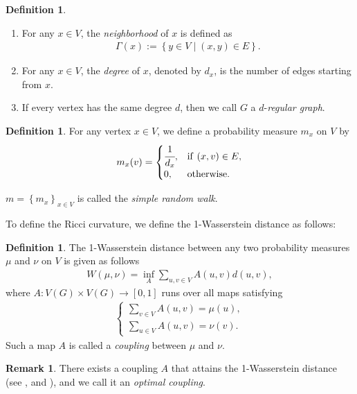 \documentclass[leqno,12pt]{amsart} %
\theoremstyle{plain} %
\theoremstyle{definition} %
\newtheorem{definition}[theorem]{\indent\sc Definition}
\newtheorem{remark}[theorem]{\indent\sc Remark}
\begin{document}
\begin{definition}
	\begin{enumerate}
 	\renewcommand{\labelenumi}{(\arabic{enumi})}
 	\item For any $x \in V$, the {\em neighborhood} of $x$ is defined as
   		\begin{eqnarray*}
   		\Gamma(x) := \left\{y \in V \mid (x, y) \in E \right\}.
   		\end{eqnarray*}
  	\item For any $x \in V$, the {\em degree} of $x$, denoted by $d_{x}$, is the number of edges starting from $x$.
	\item If every vertex has the same degree $d$, then we call $G$ a $d$-{\em regular graph}.
   	\end{enumerate}
\end{definition}

\begin{definition}
For any vertex $x \in V$, we define a probability measure $m_{x}$ on $V$ by
	\begin{eqnarray*}
    	m_{x}(v) = 
    		\begin{cases}
    		\cfrac{1}{d_{x}}, &\mathrm{if}\ (x, v) \in E, \\
    		0, & \mathrm{\mathrm{otherwise}}.
    		\end{cases}
   	\end{eqnarray*}
\end{definition} 
$m=\left\{ m_x \right\}_{x \in V}$ is called the {\em simple random walk}.

To define the Ricci curvature, we define the 1-Wasserstein distance as follows:
\begin{definition}
The 1-Wasserstein distance between any two probability measures $\mu$ and $\nu$ on $V$ is given as follows
	\begin{eqnarray*}
	W(\mu, \nu) = \inf_{A} \sum_{u, v \in V}A(u, v)d(u, v),
	\end{eqnarray*}
	where $A : V(G) \times V(G) \to [0, 1]$ runs over all maps satisfying 
	\begin{eqnarray}
	\label{coupling}
		\begin{cases}
		\sum_{v \in V}A(u, v) = \mu(u),\\
		\sum_{u \in V}A(u, v) = \nu(v).
		\end{cases}
	\end{eqnarray}
Such a map $A$ is called a {\em coupling} between $\mu$ and $\nu$. 
\end{definition}
	\begin{remark}
	There exists a coupling $A$ that attains the 1-Wasserstein distance (see \cite{Le}, \cite{Vi1} and \cite{Vi2}), and we call it an {\em optimal coupling}.
	\end{remark}
	
\end{document}
